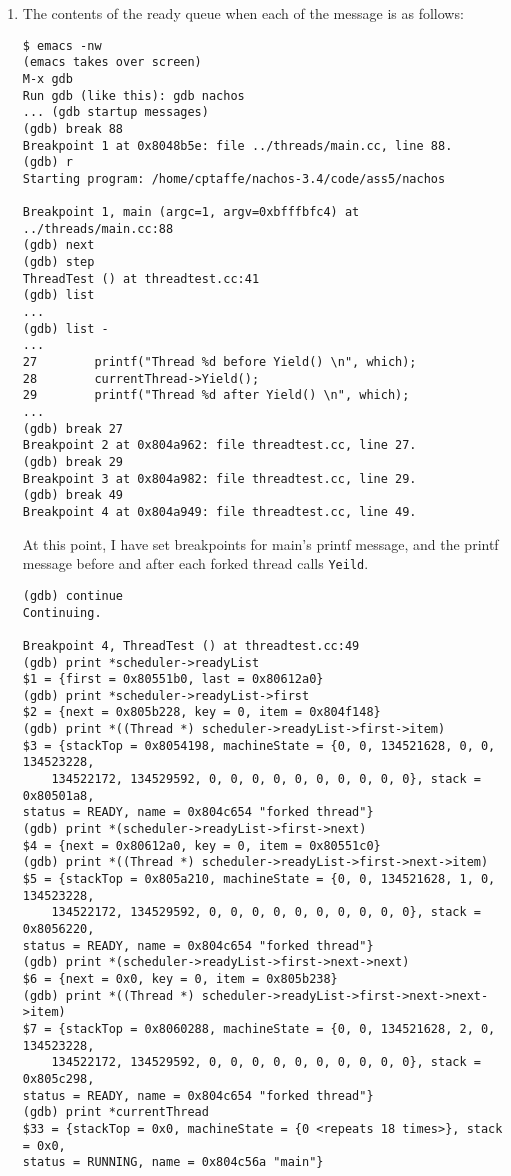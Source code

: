 \documentclass[letterpaper, 10pt]{article}
\begin{document}
	\begin{enumerate}

	\item{

	The contents of the ready queue when each of the message is as follows:

	\begin{verbatim}
$ emacs -nw
(emacs takes over screen)
M-x gdb
Run gdb (like this): gdb nachos
... (gdb startup messages)
(gdb) break 88
Breakpoint 1 at 0x8048b5e: file ../threads/main.cc, line 88.
(gdb) r
Starting program: /home/cptaffe/nachos-3.4/code/ass5/nachos

Breakpoint 1, main (argc=1, argv=0xbfffbfc4) at ../threads/main.cc:88
(gdb) next
(gdb) step
ThreadTest () at threadtest.cc:41
(gdb) list
...
(gdb) list -
...
27        printf("Thread %d before Yield() \n", which);
28        currentThread->Yield();
29        printf("Thread %d after Yield() \n", which);
...
(gdb) break 27
Breakpoint 2 at 0x804a962: file threadtest.cc, line 27.
(gdb) break 29
Breakpoint 3 at 0x804a982: file threadtest.cc, line 29.
(gdb) break 49
Breakpoint 4 at 0x804a949: file threadtest.cc, line 49.
	\end{verbatim}

	At this point, I have set breakpoints for main's printf message, and the printf message before and after each forked thread calls {\tt Yeild}.

	\begin{verbatim}
(gdb) continue
Continuing.

Breakpoint 4, ThreadTest () at threadtest.cc:49
(gdb) print *scheduler->readyList
$1 = {first = 0x80551b0, last = 0x80612a0}
(gdb) print *scheduler->readyList->first
$2 = {next = 0x805b228, key = 0, item = 0x804f148}
(gdb) print *((Thread *) scheduler->readyList->first->item)
$3 = {stackTop = 0x8054198, machineState = {0, 0, 134521628, 0, 0, 134523228,
	134522172, 134529592, 0, 0, 0, 0, 0, 0, 0, 0, 0, 0}, stack = 0x80501a8,
status = READY, name = 0x804c654 "forked thread"}
(gdb) print *(scheduler->readyList->first->next)
$4 = {next = 0x80612a0, key = 0, item = 0x80551c0}
(gdb) print *((Thread *) scheduler->readyList->first->next->item)
$5 = {stackTop = 0x805a210, machineState = {0, 0, 134521628, 1, 0, 134523228,
	134522172, 134529592, 0, 0, 0, 0, 0, 0, 0, 0, 0, 0}, stack = 0x8056220,
status = READY, name = 0x804c654 "forked thread"}
(gdb) print *(scheduler->readyList->first->next->next)
$6 = {next = 0x0, key = 0, item = 0x805b238}
(gdb) print *((Thread *) scheduler->readyList->first->next->next->item)
$7 = {stackTop = 0x8060288, machineState = {0, 0, 134521628, 2, 0, 134523228,
	134522172, 134529592, 0, 0, 0, 0, 0, 0, 0, 0, 0, 0}, stack = 0x805c298,
status = READY, name = 0x804c654 "forked thread"}
(gdb) print *currentThread
$33 = {stackTop = 0x0, machineState = {0 <repeats 18 times>}, stack = 0x0,
status = RUNNING, name = 0x804c56a "main"}
	\end{verbatim}

}
\end{enumerate}
\end{document}
